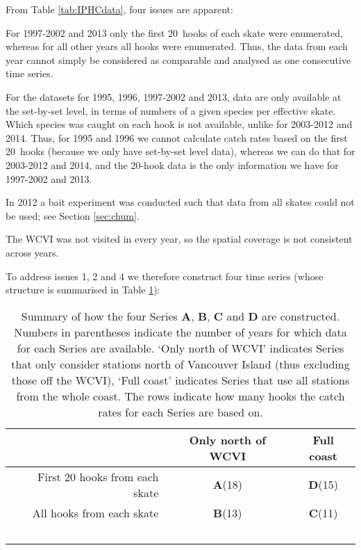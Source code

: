 

From Table \ref{tab:IPHCdata}, four issues are apparent: 

\begin{resdoclist}

\item For 1997-2002 and 2013 only the first 20~hooks of each skate were
enumerated, whereas for all other years all hooks were enumerated. Thus, the
data from each year cannot simply be considered as comparable and analysed as
one consecutive time series.

\item For the datasets for 1995, 1996, 1997-2002 and 2013, data are only
available at the set-by-set level, in terms of numbers of a given species per
effective skate. Which species was caught on each hook is not available, unlike
for 2003-2012 and 2014. Thus, for 1995 and 1996 we cannot calculate catch rates
based on the first 20~hooks (because we only have set-by-set level data),
whereas we can do that for 2003-2012 and 2014, and the 20-hook data is the only
information we have for 1997-2002 and 2013.

\item In 2012 a bait experiment was conducted such that data from all skates
could not be used; see Section \ref{sec:chum}.

\item The WCVI was not visited in every year, so the spatial coverage is not
consistent across years.

\end{resdoclist}


To address issues 1, 2 and 4 we therefore construct four time series (whose
structure is summarised in Table \ref{tab:seriesSumm}):

\begin{table}[t] \centering
\caption{Summary of how the four Series {\bf A}, {\bf B}, {\bf C} and {\bf D}
are constructed. Numbers in parentheses indicate the number of years for which
data for each Series are available. `Only north of WCVI' indicates Series that
only consider stations north of Vancouver Island (thus excluding those off the
WCVI), `Full coast' indicates Series that use all stations from the whole
coast. The rows indicate how many hooks the catch rates for each Series are
based on.}
\label{tab:seriesSumm}
\begin{tabular}{rcc}
\hline
 & Only north of WCVI & Full coast \\
\hline
First 20 hooks from each skate & {\bf A}(18) & {\bf D}(15)\\
All hooks from each skate & {\bf B}(13) & {\bf C}(11)\\
\hline
~\\    %
\end{tabular}
\end{table}


